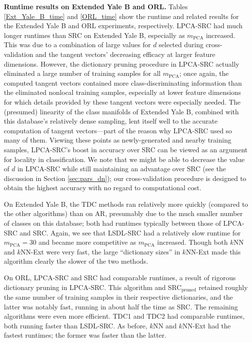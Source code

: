 \documentclass[review]{elsarticle}
\begin{document}
\textbf{Runtime results on Extended Yale B and ORL.} Tables \ref{Ext_Yale_B_time} and \ref{ORL_time} show the runtime and related results for the Extended Yale B and ORL experiments, respectively. LPCA-SRC had much longer runtimes than SRC on Extended Yale B, especially as $m_\mathrm{PCA}$ increased. This was due to a combination of large values for $d$ selected during cross-validation and the tangent vectors' decreasing efficacy at larger feature dimensions. However, the dictionary pruning procedure in LPCA-SRC actually eliminated a large number of training samples for all $m_\mathrm{PCA}$; once again, the computed tangent vectors contained more class-discriminating information than the eliminated nonlocal training samples, especially at lower feature dimensions for which details provided by these tangent vectors were especially needed. The (presumed) linearity of the class manifolds of Extended Yale B, combined with this database's relatively dense sampling, lent itself well to the accurate computation of tangent vectors---part of the reason why LPCA-SRC used so many of them. Viewing these points as newly-generated and nearby training samples, LPCA-SRC's boost in accuracy over SRC can be viewed as an argument for locality in classification. We note that we might be able to decrease the value of $d$ in LPCA-SRC while still maintaining an advantage over SRC (see the discussion in Section \ref{sec:pars_dn}); our cross-validation procedure is designed to obtain the highest accuracy with no regard to computational cost. 

On Extended Yale B, the TDC methods ran relatively more quickly (compared to the other algorithms) than on AR, presumably due to the much smaller number of classes on this database; both had runtimes typically between those of LPCA-SRC and SRC. Again, we see that LSDL-SRC had a relatively slow runtime for $m_\mathrm{PCA} = 30$ and became more competitive as $m_\mathrm{PCA}$ increased. Though both $k$NN and $k$NN-Ext were very fast, the large ``dictionary sizes'' in $k$NN-Ext made this algorithm clearly the slower of the two methods.


On ORL, LPCA-SRC and SRC had comparable runtimes, a result of rigorous dictionary pruning in LPCA-SRC. This algorithm and SRC$_\mathrm{pruned}$ retained roughly the same number of training samples in their respective dictionaries, and the latter was notably fast, running in about half the time as SRC. The remaining algorithms were even more efficient. TDC1 and TDC2 had comparable runtimes, both running faster than LSDL-SRC. As before, $k$NN and $k$NN-Ext had the fastest runtimes; the former was faster than the latter.
\end{document}
